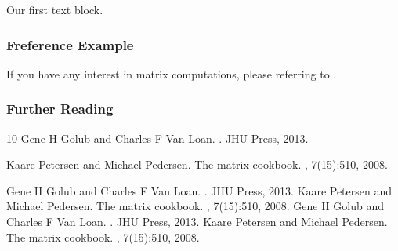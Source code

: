 \documentclass{beamer}
\begin{document}
\begin{frame}
    \begin{center}
        \begin{minipage}{3.5cm}
            \begin{block}{}
                Our first text block.   
            \end{block}
        \end{minipage}
    \end{center}
\end{frame}

\begin{frame}
    \frametitle{Freference Example}
    If you have any interest in matrix computations, please referring to \cite{golub2013matrix, petersen2008the}.
\end{frame}

\begin{frame}[allowframebreaks] %
    \frametitle<presentation>{Further Reading}
    \begin{thebibliography}{10}
        \beamertemplatebookbibitems %
        Gene H Golub and Charles F Van Loan.
        .
        \newblock JHU Press, 2013.

        \beamertemplatearticlebibitems %
        Kaare Petersen and Michael Pedersen.
        \newblock The matrix cookbook.
        , 7(15):510, 2008.

        \beamertemplatebookbibitems 
        Gene H Golub and Charles F Van Loan.
        .
        \newblock JHU Press, 2013.
        \beamertemplatearticlebibitems 
        Kaare Petersen and Michael Pedersen.
        \newblock The matrix cookbook.
        , 7(15):510, 2008.
        \beamertemplatebookbibitems
        Gene H Golub and Charles F Van Loan.
        .
        \newblock JHU Press, 2013.
        \beamertemplatearticlebibitems 
        Kaare Petersen and Michael Pedersen.
        \newblock The matrix cookbook.
        , 7(15):510, 2008.
    \end{thebibliography}
\end{frame}
\end{document}
